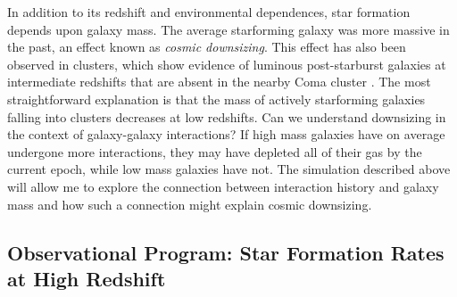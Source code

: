 \documentclass[12pt]{plan}
\begin{document}
In addition to its redshift and environmental dependences, star
formation depends upon galaxy mass.  The average starforming
galaxy was more massive in the past, an
effect known as {\em cosmic downsizing}\cite{Cowie99,Kauffmann03}.  This effect has also been
observed in clusters, which show evidence of luminous post-starburst
galaxies at intermediate redshifts that are absent in the nearby Coma
cluster \cite{Poggianti03}.  The most straightforward explanation is
that the mass of actively starforming galaxies falling into clusters
decreases at low redshifts.  Can we understand downsizing in the
context of galaxy-galaxy interactions?  If high mass galaxies have on
average undergone more interactions, they may have depleted all of
their gas by the current epoch, while low mass galaxies have not.  The
simulation described above will allow me to explore the connection
between interaction history and galaxy mass and how such a connection
might explain cosmic downsizing.
 
\label{sec:observations}

\vspace*{-3mm}
\subsection*{Observational Program:  Star Formation Rates at High Redshift}
\vspace{-2mm}
\end{document}
